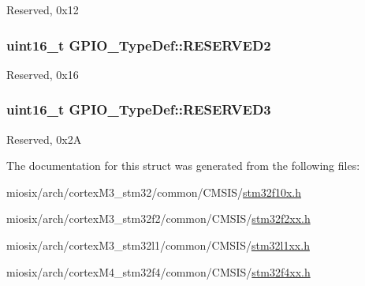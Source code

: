 Reserved, 0x12 \hypertarget{struct_g_p_i_o___type_def_a67d9355cb52b179d1d34e860a6750a8a}{
\subsubsection[{R\-E\-S\-E\-R\-V\-E\-D2}]{\setlength{\rightskip}{0pt plus 5cm}uint16\-\_\-t G\-P\-I\-O\-\_\-\-Type\-Def\-::\-R\-E\-S\-E\-R\-V\-E\-D2}}\label{struct_g_p_i_o___type_def_a67d9355cb52b179d1d34e860a6750a8a}
Reserved, 0x16 \hypertarget{struct_g_p_i_o___type_def_a0d4f86adb13774488d491504df642e3c}{
\subsubsection[{R\-E\-S\-E\-R\-V\-E\-D3}]{\setlength{\rightskip}{0pt plus 5cm}uint16\-\_\-t G\-P\-I\-O\-\_\-\-Type\-Def\-::\-R\-E\-S\-E\-R\-V\-E\-D3}}\label{struct_g_p_i_o___type_def_a0d4f86adb13774488d491504df642e3c}
Reserved, 0x2\-A 

The documentation for this struct was generated from the following files\-:\begin{DoxyCompactItemize}
\item 
miosix/arch/cortex\-M3\-\_\-stm32/common/\-C\-M\-S\-I\-S/\hyperlink{stm32f10x_8h}{stm32f10x.\-h}\item 
miosix/arch/cortex\-M3\-\_\-stm32f2/common/\-C\-M\-S\-I\-S/\hyperlink{stm32f2xx_8h}{stm32f2xx.\-h}\item 
miosix/arch/cortex\-M3\-\_\-stm32l1/common/\-C\-M\-S\-I\-S/\hyperlink{stm32l1xx_8h}{stm32l1xx.\-h}\item 
miosix/arch/cortex\-M4\-\_\-stm32f4/common/\-C\-M\-S\-I\-S/\hyperlink{stm32f4xx_8h}{stm32f4xx.\-h}\end{DoxyCompactItemize}
